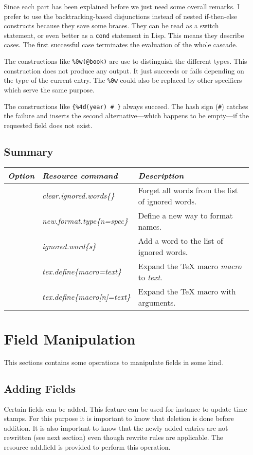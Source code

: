 \documentclass[11pt,a4paper]{scrbook}
\makeatletter
\newcommand\rsc[1]{\textsf{#1}\index{#1@\textsf{#1}}}
\newenvironment{Summary}{\subsection*{Summary}
  \begin{center}\small
    \begin{tabular}{p{.08\textwidth}p{.35\textwidth}p{.48\textwidth}}
      \toprule
      \textit{\scriptsize Option}&
      \textit{\scriptsize Resource command}&
      \textit{\scriptsize Description}\\
      \midrule
}{\bottomrule\end{tabular}\end{center}}
\newcommand\Desc[3]{\textit{#1}&\textit{#2}&#3\\\hline}
\makeatother
\begin{document}
Since each part has been explained before we just need some overall remarks. I
prefer to use the backtracking-based disjunctions instead of nested
if-then-else constructs because they save some braces. They can be read as a
switch statement, or even better as a \texttt{cond} statement in Lisp. This
means they describe cases. The first successful case terminates the evaluation
of the whole cascade.

The constructions like \verb|%0w(@book)| are use to distinguish the different
types. This construction does not produce any output. It just succeeds or
fails depending on the type of the current entry. The \verb|%0w| could also
be replaced by other specifiers which serve the same purpose.

The constructions like \verb|{%4d(year) # }| always succeed. The hash sign
(\verb|#|) catches the failure and inserts the second alternative---which
happens to be empty---if the requested field does not exist.


\begin{Summary}
  \Desc{}{\rsc{clear.ignored.words}\{\}}{Forget all words from the list of
    ignored words.}
  \Desc{}{\rsc{new.format.type}\{n=spec\}}{Define a new way to format names.}
  \Desc{}{\rsc{ignored.word}\{s\}}{Add a word to the list of ignored words.}
  \Desc{}{\rsc{tex.define}\{macro=text\}}{Expand the \TeX{} macro
    \textit{macro} to \textit{text}.} 
  \Desc{}{\rsc{tex.define}\{macro[n]=text\}}{Expand the \TeX{} macro
    with arguments.}
\end{Summary}

\section{Field Manipulation}

This sections contains some operations to manipulate fields in some kind.

\subsection{Adding Fields}

Certain fields can be added. This feature can be used for instance
to update time stamps. For this purpose it is important to know that deletion
is done before addition. It is also important to know that the newly added
entries are not rewritten (see next section) even though rewrite rules are
applicable. The resource \rsc{add.field} is provided to perform this
operation.
\end{document}

